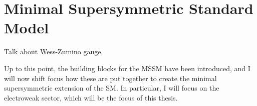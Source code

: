 \documentclass[../main.tex]{subfiles}
\begin{document}
\section{Minimal Supersymmetric Standard Model}

\begin{TODO}
  \item Talk about Wess-Zumino gauge.
\end{TODO}

Up to this point, the building blocks for the MSSM have been introduced, and I will now shift focus how these are put together to create the minimal supersymmetric extension of the SM.
In particular, I will focus on the electroweak sector, which will be the focus of this thesis.
\end{document}
